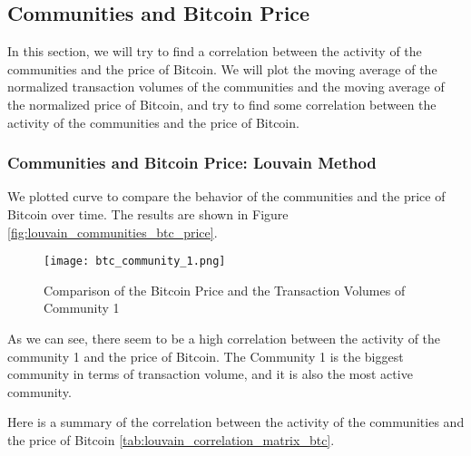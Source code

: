 \documentclass[a4paper, 12pt]{article}
\begin{document}
\newpage

\subsection{Communities and Bitcoin Price}

In this section, we will try to find a correlation between the activity of the communities and the price of Bitcoin.
We will plot the moving average of the normalized transaction volumes of the communities and the moving average of the normalized price of Bitcoin,
and try to find some correlation between the activity of the communities and the price of Bitcoin.

\subsubsection{Communities and Bitcoin Price: Louvain Method}

We plotted curve to compare the behavior of the communities and the price of Bitcoin over time. 
The results are shown in Figure \ref{fig:louvain_communities_btc_price}.

\begin{figure}[h]
    \centering
    \texttt{[image: btc\_community\_1.png]}
    \caption{Comparison of the Bitcoin Price and the Transaction Volumes of Community 1}
    \label{fig:enter-label}
\end{figure}

As we can see, there seem to be a high correlation between the activity of the community 1 and the price of Bitcoin. The Community 1 
is the biggest community in terms of transaction volume, and it is also the most active community. 

Here is a summary of the correlation between the activity of the communities and the price of Bitcoin \ref{tab:louvain_correlation_matrix_btc}.
\end{document}
